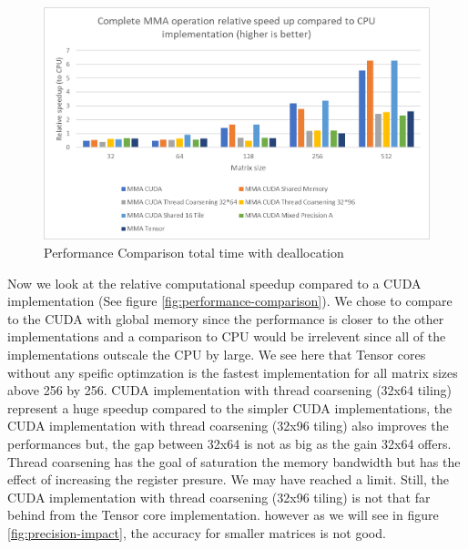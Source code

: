 \documentclass[conference]{IEEEtran}
\begin{document}
  \begin{figure}[h]
    \centering
    \includegraphics[scale=0.5]{figures/Tot_time_relative_speedup.png}
    \caption{Performance Comparison total time with deallocation}
    \label{fig:time-comparison}
  \end{figure}

  Now we look at the relative computational speedup compared to a CUDA implementation (See figure \ref{fig:performance-comparison}).
  We chose to compare to the CUDA with global memory since the performance is closer to 
  the other implementations and a comparison to CPU would be irrelevent since all of the implementations
  outscale the CPU by large. We see here that Tensor cores without any speific optimzation is the fastest
  implementation for all matrix sizes above 256 by 256. CUDA implementation with thread coarsening (32x64 tiling) represent a huge
  speedup compared to the simpler CUDA implementations, the CUDA implementation with thread coarsening (32x96 tiling) also improves
  the performances but, the gap between 32x64 is not as big as the gain 32x64 offers. Thread coarsening has the goal
  of saturation the memory bandwidth but has the effect of increasing the register presure. We may have reached a limit.
  Still, the CUDA implementation with thread coarsening (32x96 tiling) is not that far behind from the Tensor core implementation.
  however as we will see in figure \ref{fig:precision-impact}, the accuracy for smaller matrices is not good.
\end{document}

